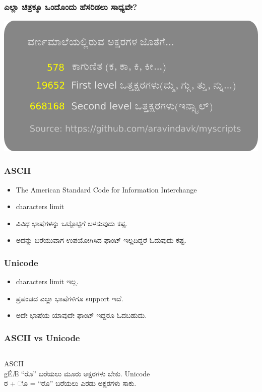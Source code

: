 \documentclass[16pt]{beamer}
\newcommand\en[1]{{\english #1}}
\begin{document}
\begin{spacing}{1.6}
  \begin{frame}
    \frametitle{ಎಲ್ಲಾ ಚಿತ್ರಕ್ಕೂ ಒಂದೊಂದು ಹೆಸರಿಡಲು ಸಾಧ್ಯವೇ?}
    \includegraphics[width=\textwidth]{images/stats.png}
  \end{frame}

  \begin{frame}
    \frametitle{\en{ASCII}}
    \begin{itemize}
    \item \en{The American Standard Code for Information Interchange}
    \item \en{128 characters limit}
    \item ವಿವಿಧ ಭಾಷೆಗಳನ್ನು ಒಟ್ಟೊಟ್ಟಿಗೆ ಬಳಸುವುದು ಕಷ್ಟ.
    \item ಅದನ್ನು ಬರೆಯುವಾಗ ಉಪಯೋಗಿಸಿದ ಫಾಂಟ್ ಇಲ್ಲದಿದ್ದರೆ ಓದುವುದು ಕಷ್ಟ.
    \end{itemize}
  \end{frame}

  \begin{frame}
    \frametitle{\en{Unicode}}
    \begin{itemize}
    \item \en{characters limit} ಇಲ್ಲ.
    \item ಪ್ರಪಂಚದ ಎಲ್ಲಾ ಭಾಷೆಗಳಿಗೂ \en{support} ಇದೆ.
    \item ಅದೇ ಭಾಷೆಯ ಯಾವುದೇ ಫಾಂಟ್ ಇದ್ದರೂ ಓದಬಹುದು.

    \end{itemize}
  \end{frame}

  \begin{frame}
    \frametitle{\en{ASCII vs Unicode}}
    \begin{columns}[t]
      \column{5cm}
      \LARGE{\en{ASCII}} \\
      \normalsize \en{gÉÆ} ``ರೊ'' ಬರೆಯಲು ಮೂರು ಅಕ್ಷರಗಳು ಬೇಕು.
      \column{5cm}
      \LARGE{\en{Unicode}} \\
      \normalsize ರ +  ೊ  = ``ರೊ'' ಬರೆಯಲು ಎರಡು ಅಕ್ಷರಗಳು ಸಾಕು.
    \end{columns}
  \end{frame}


\end{spacing}
\end{document}
